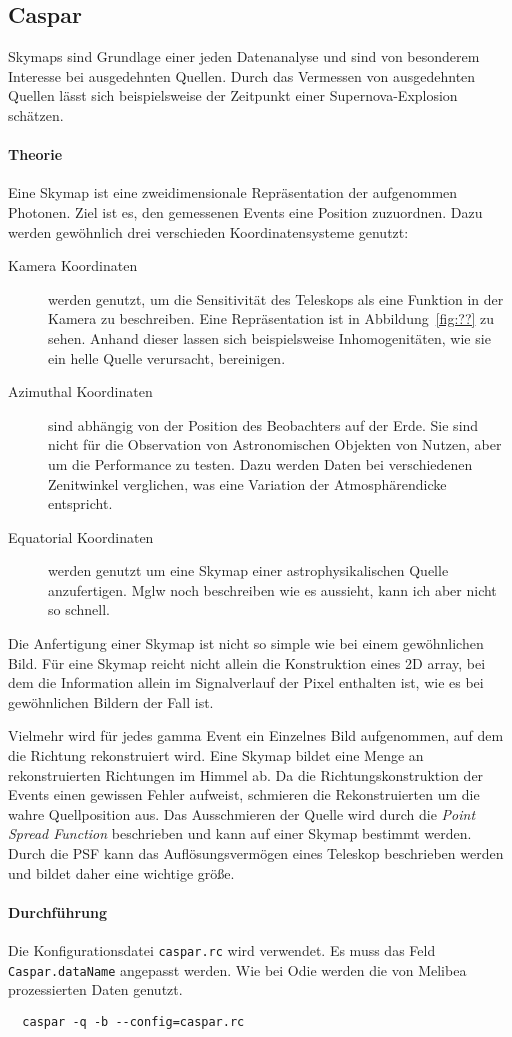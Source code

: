 \subsection{Caspar}%
\label{sub:caspar}
Skymaps sind Grundlage einer jeden Datenanalyse
und sind von besonderem Interesse bei ausgedehnten Quellen.
Durch das Vermessen von ausgedehnten Quellen
lässt sich beispielsweise der Zeitpunkt einer Supernova-Explosion schätzen.

\paragraph{Theorie}%
\label{par:theorie}
Eine Skymap ist eine zweidimensionale Repräsentation der aufgenommen Photonen.
Ziel ist es, den gemessenen Events eine Position zuzuordnen.
Dazu werden ge\-wöhn\-lich drei verschieden Koordinatensysteme genutzt:

\begin{description}
	\item[\quad Kamera Koordinaten] werden genutzt, um die Sensitivität des
    Teleskops
		als eine Funktion in der Kamera zu beschreiben.
		Eine Repräsentation ist in Abbildung~\ref{fig:??} zu sehen.
		Anhand dieser lassen sich beispielsweise Inhomogenitäten,
		wie sie ein helle Quelle verursacht, bereinigen.

	\item[\quad Azimuthal Koordinaten] sind abhängig von der Position des
		Beobachters auf der Erde.
		Sie sind nicht für die Observation von Astronomischen Objekten von Nutzen,
		aber um die Performance zu testen.
		Dazu werden Daten bei verschiedenen Zenitwinkel verglichen,
    was eine Variation der Atmosphärendicke entspricht.

	\item[\quad Equatorial Koordinaten] werden genutzt um eine Skymap einer
		astrophysikalischen Quelle anzufertigen.
		Mglw noch beschreiben wie es aussieht, kann ich aber nicht so schnell.
\end{description}

Die Anfertigung einer Skymap ist nicht so simple wie bei einem gewöhnlichen
Bild.
Für eine Skymap reicht nicht allein die Konstruktion eines 2D array,
bei dem die Information allein im Signalverlauf der Pixel enthalten ist,
wie es bei gewöhnlichen Bildern der Fall ist.

Vielmehr wird für jedes gamma Event ein Einzelnes Bild aufgenommen,
auf dem die Richtung rekonstruiert wird.
Eine Skymap bildet eine Menge an rekonstruierten Richtungen im Himmel ab.
Da die Richtungskonstruktion der Events einen gewissen Fehler aufweist,
schmieren die Rekonstruierten um die wahre Quellposition aus.
Das Ausschmieren der Quelle wird durch die \textit{Point Spread Function}
beschrieben
und kann auf einer Skymap bestimmt werden.
Durch die PSF kann das Auflösungsvermögen eines Teleskop beschrieben werden und
bildet daher eine wichtige größe.

\paragraph{Durchführung}%

Die Konfigurationsdatei \texttt{caspar.rc} wird verwendet.
Es muss das Feld \texttt{Caspar.dataName} angepasst werden.
Wie bei Odie werden die von Melibea prozessierten Daten genutzt.


\begin{lstlisting}
  caspar -q -b --config=caspar.rc
\end{lstlisting}

